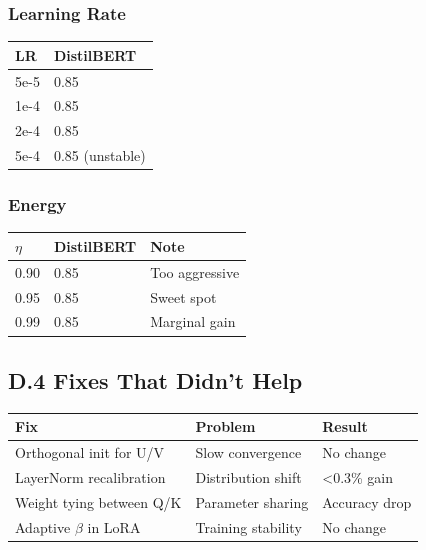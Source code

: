 \subsubsection{Learning Rate}

\begin{table}[H]
\centering
\small
\begin{tabular}{ll}
\toprule
\textbf{LR} & \textbf{DistilBERT} \\
\midrule
5e-5 & 0.85 \\
1e-4 & 0.85 \\
2e-4 & 0.85 \\
5e-4 & 0.85 (unstable) \\
\bottomrule
\end{tabular}
\end{table}

\subsubsection{Energy}

\begin{table}[H]
\centering
\small
\begin{tabular}{lll}
\toprule
\textbf{$\eta$} & \textbf{DistilBERT} & \textbf{Note} \\
\midrule
0.90 & 0.85 & Too aggressive \\
0.95 & 0.85 & Sweet spot \\
0.99 & 0.85 & Marginal gain \\
\bottomrule
\end{tabular}
\end{table}

\subsection{D.4 Fixes That Didn't Help}

\begin{table}[H]
\centering
\small
\begin{tabular}{lll}
\toprule
\textbf{Fix} & \textbf{Problem} & \textbf{Result} \\
\midrule
Orthogonal init for U/V & Slow convergence & No change \\
LayerNorm recalibration & Distribution shift & \textless{}0.3\% gain \\
Weight tying between Q/K & Parameter sharing & Accuracy drop \\
Adaptive $\beta$ in LoRA & Training stability & No change \\
\bottomrule
\end{tabular}
\end{table}

